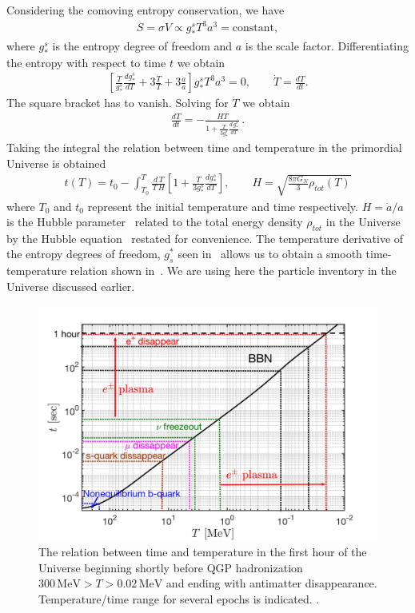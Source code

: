 Considering the comoving entropy conservation, we have
\begin{align}
S=\sigma V\propto g^s_\ast T^3a^3=\mathrm{constant},
\end{align}
where $g^s_\ast$ is the entropy degree of freedom and $a$ is the scale factor. Differentiating the entropy with respect to time $t$ we obtain
\begin{align}
\left[\frac{\dot{T}}{g^s_\ast}\frac{dg^s_\ast}{dT}+3\frac{\dot{T}}{T}+3\frac{\dot{a}}{a}\right]g^s_\ast T^3a^3=0,\qquad \dot{T}=\frac{dT}{dt}.
\end{align}
The square bracket has to vanish. Solving for $\dot T $ we obtain
\begin{align}
\frac{dT}{dt}=-\frac{HT}{1+\frac{T}{3g^s_\ast}\frac{d\,g^s_\ast}{dT}}\,.
\end{align}
Taking the integral the relation between time and temperature in the primordial Universe is obtained
\begin{align}\label{time}
t(T)=t_0-\int^T_{T_0} \frac{d\,T }{T\,H}\left[1+\frac{T}{3g^s_\ast}\frac{dg^s_\ast}{dT}\right],\qquad H=\sqrt{\frac{8\pi G_N}{3}\rho_{tot}(T)}
\end{align}
where $T_0$ and $t_0$ represent the initial temperature and time respectively. $H=\dot a/a$ is the Hubble parameter~ related to the total energy density $\rho_{tot}$ in the Universe by the Hubble equation~ restated for convenience. The temperature derivative of the entropy degrees of freedom, $g^\ast_s$ seen in~ allows us to obtain a smooth time-temperature relation shown in~. We are using here the particle inventory in the Universe discussed earlier.

\begin{figure}
\centerline{\includegraphics[width=0.90\linewidth]{01-introduction/Figures/CosmicTimeTemperature.jpg}}
 \caption{The relation between time and temperature in the first hour of the Universe beginning shortly before QGP hadronization $300\,\mathrm{MeV}>T>0.02\,\mathrm{MeV} $ and ending with antimatter disappearance. Temperature/time range for several epochs is indicated. .}
 \label{Fig:Overview}
\end{figure}

